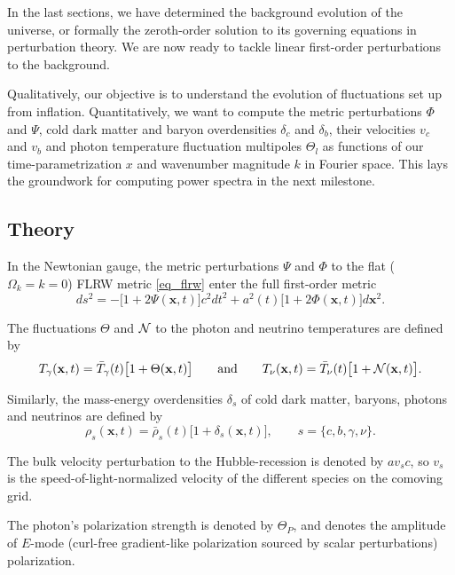 \documentclass[10pt,a4paper]{article}
\begin{document}
In the last sections, we have determined the background evolution of the universe,
or formally the zeroth-order solution to its governing equations in perturbation theory.
We are now ready to tackle linear first-order perturbations to the background.

Qualitatively, our objective is to understand the evolution of fluctuations set up from inflation.
Quantitatively, we want to compute the
metric perturbations $\Phi$ and $\Psi$,
cold dark matter and baryon overdensities $\delta_c$ and $\delta_b$,
their velocities $v_c$ and $v_b$
and photon temperature fluctuation multipoles $\Theta_l$
as functions of our time-parametrization $x$ and wavenumber magnitude $k$ in Fourier space.
This lays the groundwork for computing power spectra in the next milestone.

\subsection{Theory}

In the Newtonian gauge,
the metric perturbations $\Psi$ and $\Phi$ to the flat ($\Omega_k=k=0$) FLRW metric \eqref{eq_flrw}
enter the full first-order metric
\begin{equation}
	ds^2 = -\big[1 + 2\Psi(\mathbf{x},t)\big] c^2 dt^2 + a^2(t) \big[1 + 2\Phi(\mathbf{x},t)\big] d\mathbf{x}^2 .
\label{eq_metric}
\end{equation}

The fluctuations $\Theta$ and $\mathcal{N}$ to the photon and neutrino temperatures are defined by
\begin{equation}
	T_\gamma(\mathbf{x},t) = \bar{T}_\gamma(t) \big[1+\Theta(\mathbf{x},t)\big]
	\qquad \text{and} \qquad
	T_\nu(\mathbf{x},t) = \bar{T}_\nu(t) \big[1+\mathcal{N}(\mathbf{x},t)\big].
\end{equation}

Similarly, the mass-energy overdensities $\delta_s$ of cold dark matter, baryons, photons and neutrinos are defined by
\begin{equation}
	\rho_s(\mathbf{x},t) = \bar{\rho}_s(t) \big[1+\delta_s(\mathbf{x},t)\big], \qquad s=\{c,b,\gamma,\nu\}.
\end{equation}

The bulk velocity perturbation to the Hubble-recession is denoted by $a v_s c$,
so $v_s$ is the speed-of-light-normalized velocity of the different species on the comoving grid.

The photon's polarization strength is denoted by $\Theta_P$,
and denotes the amplitude of $E$-mode (curl-free gradient-like polarization sourced by scalar perturbations) polarization.
\end{document}
